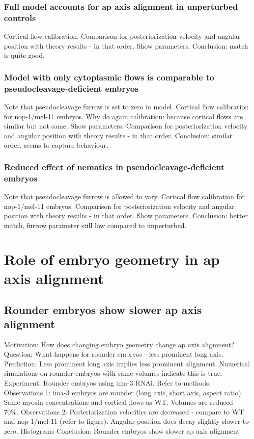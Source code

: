 \subsubsection{Full model accounts for \ac{ap} axis alignment in unperturbed controls}\label{subsubsec:fullModelForWT}
Cortical flow calibration. Comparison for posteriorization velocity and angular position with theory results - in that order. Show parameters. Conclusion: match is quite good.
\subsubsection{Model with only cytoplasmic flows is comparable to pseudocleavage-deficient embryos}\label{subsubsec:cytoModelForNop1Mel11}
Note that pseudocleavage furrow is set to zero in model. Cortical flow calibration for nop-1/mel-11 embryos. Why do again calibration: because cortical flows are similar but not same. Show parameters. Comparison for posteriorization velocity and angular position with theory results - in that order. Conclusion: similar order, seems to capture behaviour.
\subsubsection{Reduced effect of nematics in pseudocleavage-deficient embryos}\label{subsubsec:reducedPcModelForNop1Mel11}
Note that pseudocleavage furrow is allowed to vary. Cortical flow calibration for nop-1/mel-11 embryos. Comparison for posteriorization velocity and angular position with theory results - in that order. Show parameters. Conclusion: better match, furrow parameter still low compared to unperturbed.

\section{Role of embryo geometry in \ac{ap} axis alignment}\label{sec:GeometryRole}
\subsection{Rounder embryos show slower \ac{ap} axis alignment}\label{sec:roundEmbryosIma3}
Motivation: How does changing embryo geometry change \ac{ap} axis alignment?
Question: What happens for rounder embryos - less prominent long axis.
Prediction: Less prominent long axis implies less prominent alignment. Numerical simulations on rounder embryos with same volumes indicate this is true.
Experiment: Rounder embryos using ima-3 RNAi. Refer to methods.
Observations 1: ima-3 embryos are rounder (long axis, short axis, aspect ratio). Same myosin concentrations and cortical flows as WT. Volumes are reduced - 70\%.
Observations 2: Posteriorization velocities are decreased - compare to WT and nop-1/mel-11 (refer to figure). Angular position does decay slightly slower to zero. Histograms
Conclusion: Rounder embryos show slower \ac{ap} axis alignment
